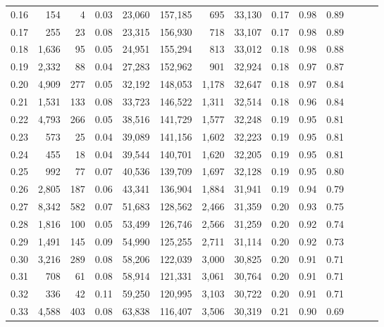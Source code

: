 \begin{tabular}{rrrrrrrrrrrrrr}
0.16 &     154 &      4 &  0.03 &   23,060 &  157,185 &     695 &  33,130 &  0.17 &  0.98 &      0.89 \\
0.17 &     255 &     23 &  0.08 &   23,315 &  156,930 &     718 &  33,107 &  0.17 &  0.98 &      0.89 \\
0.18 &   1,636 &     95 &  0.05 &   24,951 &  155,294 &     813 &  33,012 &  0.18 &  0.98 &      0.88 \\
0.19 &   2,332 &     88 &  0.04 &   27,283 &  152,962 &     901 &  32,924 &  0.18 &  0.97 &      0.87 \\
0.20 &   4,909 &    277 &  0.05 &   32,192 &  148,053 &   1,178 &  32,647 &  0.18 &  0.97 &      0.84 \\
0.21 &   1,531 &    133 &  0.08 &   33,723 &  146,522 &   1,311 &  32,514 &  0.18 &  0.96 &      0.84 \\
0.22 &   4,793 &    266 &  0.05 &   38,516 &  141,729 &   1,577 &  32,248 &  0.19 &  0.95 &      0.81 \\
0.23 &     573 &     25 &  0.04 &   39,089 &  141,156 &   1,602 &  32,223 &  0.19 &  0.95 &      0.81 \\
0.24 &     455 &     18 &  0.04 &   39,544 &  140,701 &   1,620 &  32,205 &  0.19 &  0.95 &      0.81 \\
0.25 &     992 &     77 &  0.07 &   40,536 &  139,709 &   1,697 &  32,128 &  0.19 &  0.95 &      0.80 \\
0.26 &   2,805 &    187 &  0.06 &   43,341 &  136,904 &   1,884 &  31,941 &  0.19 &  0.94 &      0.79 \\
0.27 &   8,342 &    582 &  0.07 &   51,683 &  128,562 &   2,466 &  31,359 &  0.20 &  0.93 &      0.75 \\
0.28 &   1,816 &    100 &  0.05 &   53,499 &  126,746 &   2,566 &  31,259 &  0.20 &  0.92 &      0.74 \\
0.29 &   1,491 &    145 &  0.09 &   54,990 &  125,255 &   2,711 &  31,114 &  0.20 &  0.92 &      0.73 \\
0.30 &   3,216 &    289 &  0.08 &   58,206 &  122,039 &   3,000 &  30,825 &  0.20 &  0.91 &      0.71 \\
0.31 &     708 &     61 &  0.08 &   58,914 &  121,331 &   3,061 &  30,764 &  0.20 &  0.91 &      0.71 \\
0.32 &     336 &     42 &  0.11 &   59,250 &  120,995 &   3,103 &  30,722 &  0.20 &  0.91 &      0.71 \\
0.33 &   4,588 &    403 &  0.08 &   63,838 &  116,407 &   3,506 &  30,319 &  0.21 &  0.90 &      0.69 \\

\end{tabular}
